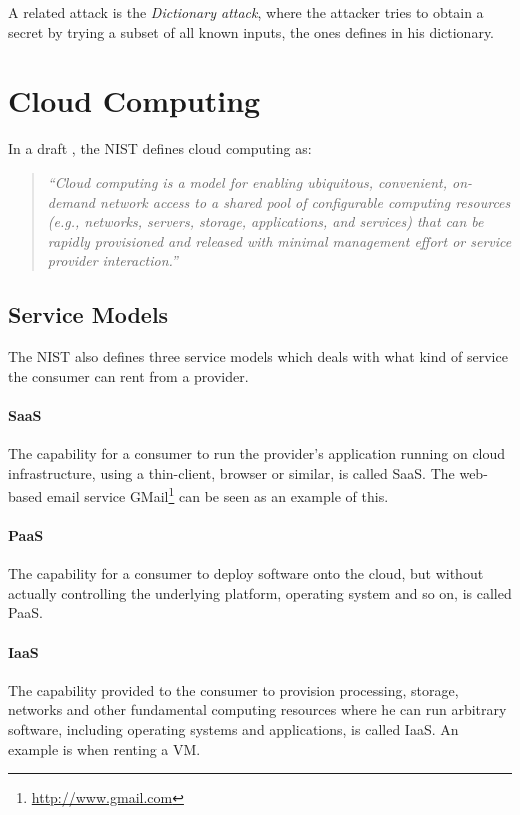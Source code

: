 \documentclass[pdftex,english,10pt,b5paper,twoside]{book}
\begin{document}
A related attack is the \emph{Dictionary attack}, where the attacker
tries to obtain a secret by trying a subset of all known inputs, the ones
defines in his dictionary.

\section{Cloud Computing}

In a draft \cite{cloud_nistdef}, the \ac{NIST} defines cloud computing as:
\begin{quote}\it
``Cloud computing is a model for enabling ubiquitous, convenient,
on-demand network access to a shared pool of configurable computing resources
(e.g., networks, servers, storage, applications, and services) that can be
rapidly provisioned and released with minimal management effort or service
provider interaction.''
\end{quote}

\subsection{Service Models}
The \ac{NIST} also defines three service models which deals with what kind of
service the consumer can rent from a provider.

\paragraph{\ac{SaaS}} The capability for a consumer to run the provider's
application running on cloud infrastructure, using a thin-client, browser or
similar, is called \ac{SaaS}. The web-based email service
GMail\footnote{\url{http://www.gmail.com}} can be seen as an example of this.

\paragraph{\ac{PaaS}} The capability for a consumer to deploy software onto
the cloud, but without actually controlling the underlying platform, operating
system and so on, is called \ac{PaaS}.

\paragraph{\ac{IaaS}} The capability provided to the consumer to provision
processing, storage, networks and other fundamental computing resources where
he can run arbitrary software, including operating systems and applications, is
called \ac{IaaS}. An example is when renting a \ac{VM}.
\end{document}
